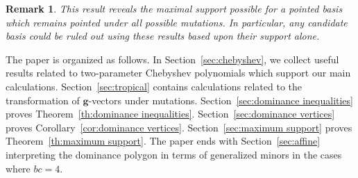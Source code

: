 \documentclass{amsart}
\newtheorem{remark}[theorem]{Remark}
\numberwithin{theorem}{section}
\newcommand{\bfg}{\boldsymbol{g}}
\begin{document}
\begin{figure}[h!]
\end{figure}

\begin{remark}
  This result reveals the maximal support possible for a pointed basis which remains pointed under all possible mutations.
  In particular, any candidate basis could be ruled out using these results based upon their support alone.
\end{remark}

The paper is organized as follows.
In Section~\ref{sec:chebyshev}, we collect useful results related to two-parameter Chebyshev polynomials which support our main calculations.
Section~\ref{sec:tropical} contains calculations related to the transformation of $\bfg$-vectors under mutations.
Section~\ref{sec:dominance inequalities} proves Theorem~\ref{th:dominance inequalities}.
Section~\ref{sec:dominance vertices} proves Corollary~\ref{cor:dominance vertices}.
Section~\ref{sec:maximum support} proves Theorem~\ref{th:maximum support}.
The paper ends with Section~\ref{sec:affine} interpreting the dominance polygon in terms of generalized minors in the cases where $bc=4$.
\end{document}
